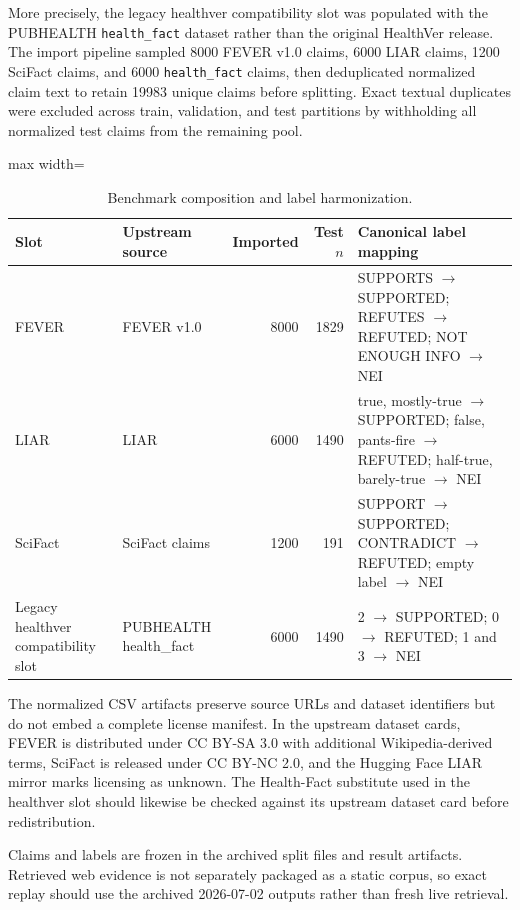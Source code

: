 \documentclass[conference]{IEEEtran}
\begin{document}
More precisely, the legacy healthver compatibility slot was populated with the PUBHEALTH \texttt{health\_fact} dataset rather than the original HealthVer release. The import pipeline sampled 8000 FEVER v1.0 claims, 6000 LIAR claims, 1200 SciFact claims, and 6000 \texttt{health\_fact} claims, then deduplicated normalized claim text to retain 19983 unique claims before splitting. Exact textual duplicates were excluded across train, validation, and test partitions by withholding all normalized test claims from the remaining pool.

\begin{table}[htbp]
\centering
\caption{Benchmark composition and label harmonization.}
\label{tab:data}
\footnotesize
\setlength{\tabcolsep}{3pt}
\begin{adjustbox}{max width=\columnwidth}
\begin{tabular}{p{1.35cm}p{1.55cm}rrp{3.35cm}}
\toprule
Slot & Upstream source & Imported & Test $n$ & Canonical label mapping \\
\midrule
FEVER & FEVER v1.0 & 8000 & 1829 & SUPPORTS $\rightarrow$ SUPPORTED; REFUTES $\rightarrow$ REFUTED; NOT ENOUGH INFO $\rightarrow$ NEI \\
LIAR & LIAR & 6000 & 1490 & true, mostly-true $\rightarrow$ SUPPORTED; false, pants-fire $\rightarrow$ REFUTED; half-true, barely-true $\rightarrow$ NEI \\
SciFact & SciFact claims & 1200 & 191 & SUPPORT $\rightarrow$ SUPPORTED; CONTRADICT $\rightarrow$ REFUTED; empty label $\rightarrow$ NEI \\
Legacy healthver compatibility slot & PUBHEALTH health\_fact & 6000 & 1490 & 2 $\rightarrow$ SUPPORTED; 0 $\rightarrow$ REFUTED; 1 and 3 $\rightarrow$ NEI \\
\bottomrule
\end{tabular}
\end{adjustbox}
\end{table}

The normalized CSV artifacts preserve source URLs and dataset identifiers but do not embed a complete license manifest. In the upstream dataset cards, FEVER is distributed under CC BY-SA 3.0 with additional Wikipedia-derived terms, SciFact is released under CC BY-NC 2.0, and the Hugging Face LIAR mirror marks licensing as unknown. The Health-Fact substitute used in the healthver slot should likewise be checked against its upstream dataset card before redistribution.

Claims and labels are frozen in the archived split files and result artifacts. Retrieved web evidence is not separately packaged as a static corpus, so exact replay should use the archived 2026-07-02 outputs rather than fresh live retrieval.
\end{document}
